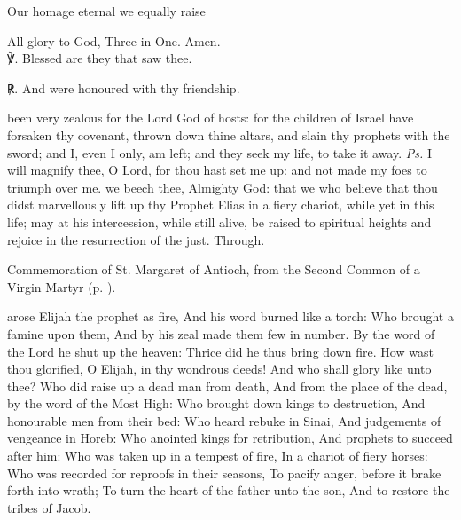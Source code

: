Our homage eternal we equally raise

All glory to God, Three in One. Amen.\\

    ℣. Blessed are they that saw thee.

	℟. And were honoured with thy friendship.
	


\introit
{} been very zealous for the Lord God of hosts: for the children of Israel have forsaken thy covenant, thrown down thine altars, and slain thy prophets with the sword; and I, even I only, am left; and they seek my life, to take it away. \textit{Ps.} I will magnify thee, O Lord, for thou hast set me up: and not made my foes to triumph over me.
\collect
{} we beech thee, Almighty God: that we who believe that thou didst marvellously lift up thy Prophet Elias in a fiery chariot, while yet in this life; may at his intercession, while still alive, be raised to spiritual heights and rejoice in the resurrection of the just. Through.
\begin{rubric}
	Commemoration of St. Margaret of Antioch, from the Second Common of a Virgin Martyr (p. \pageref{CommonVirginMartyrII}).
\end{rubric}

 arose Elijah the prophet as fire, And his word burned like a torch:  Who brought a famine upon them, And by his zeal made them few in number. By the word of the Lord he shut up the heaven: Thrice did he thus bring down fire. How wast thou glorified, O Elijah, in thy wondrous deeds! And who shall glory like unto thee? Who did raise up a dead man from death, And from the place of the dead, by the word of the Most High: Who brought down kings to destruction, And honourable men from their bed: Who heard rebuke in Sinai, And judgements of vengeance in Horeb: Who anointed kings for retribution, And prophets to succeed after him: Who was taken up in a tempest of fire, In a chariot of fiery horses: Who was recorded for reproofs in their seasons, To pacify anger, before it brake forth into wrath; To turn the heart of the father unto the son, And to restore the tribes of Jacob. 

